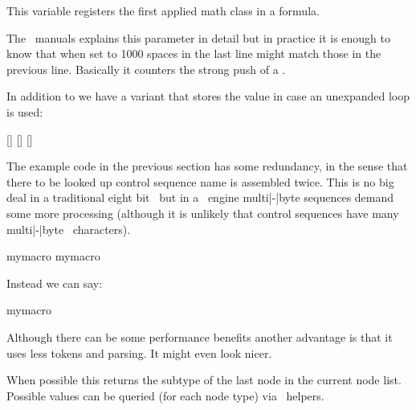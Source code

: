 \startnewprimitive[title={\prm {lastleftclass}}]

This variable registers the first applied math class in a formula.

\stopnewprimitive

\startoldprimitive[title={\prm {lastlinefit}}]

The \ETEX\ manuals explains this parameter in detail but in practice it is enough
to know that when set to 1000 spaces in the last line might match those in the
previous line. Basically it counters the strong push of a .

\stopoldprimitive

\startnewprimitive[title={\prm {lastloopiterator}}]

In addition to  we have a variant that stores the value
in case an unexpanded loop is used:

\startbuffer
{} { [\the\currentloopiterator\eq\the\lastloopiterator] }
 { [\the\currentloopiterator\eq\the\lastloopiterator] }
 { [\the\currentloopiterator\ne\the\lastloopiterator] }
\stopbuffer

\typebuffer

\startlines
\getbuffer
\stoplines

\stopnewprimitive

\startnewprimitive[title={\prm {lastnamedcs}}]

The example code in the previous section has some redundancy, in the sense that
there to be looked up control sequence name  is assembled twice.
This is no big deal in a traditional eight bit \TEX\ but in a \UNICODE\ engine
multi|-|byte sequences demand some more processing (although it is unlikely that
control sequences have many multi|-|byte \ characters).

\starttyping
\ifcsname mymacro\endcsname
    \csname mymacro\endcsname
\fi
\stoptyping

Instead we can say:

\starttyping
\ifcsname mymacro\endcsname
    \lastnamedcs
\fi
\stoptyping

Although there can be some performance benefits another advantage is that it uses
less tokens and parsing. It might even look nicer.

\stopnewprimitive

\startnewprimitive[title={\prm {lastnodesubtype}}]

When possible this returns the subtype of the last node in the current node list.
Possible values can be queried (for each node type) via \LUA\ helpers.

